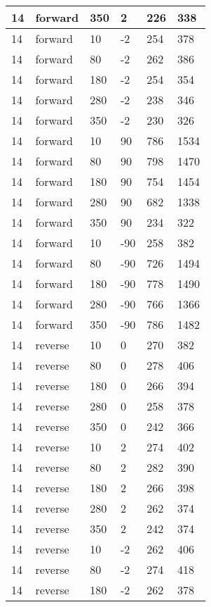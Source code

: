 \begin{longtable}{|l|l|l|l|l|l|}
			\hline
			14 & forward & 350 & 2 & 226 & 338 \\
			\hline
			14 & forward & 10 & -2 & 254 & 378 \\
			\hline
			14 & forward & 80 & -2 & 262 & 386 \\
			\hline
			14 & forward & 180 & -2 & 254 & 354 \\
			\hline
			14 & forward & 280 & -2 & 238 & 346 \\
			\hline
			14 & forward & 350 & -2 & 230 & 326 \\
			\hline
			14 & forward & 10 & 90 & 786 & 1534 \\
			\hline
			14 & forward & 80 & 90 & 798 & 1470 \\
			\hline
			14 & forward & 180 & 90 & 754 & 1454 \\
			\hline
			14 & forward & 280 & 90 & 682 & 1338 \\
			\hline
			14 & forward & 350 & 90 & 234 & 322 \\
			\hline
			14 & forward & 10 & -90 & 258 & 382 \\
			\hline
			14 & forward & 80 & -90 & 726 & 1494 \\
			\hline
			14 & forward & 180 & -90 & 778 & 1490 \\
			\hline
			14 & forward & 280 & -90 & 766 & 1366 \\
			\hline
			14 & forward & 350 & -90 & 786 & 1482 \\
			\hline
			14 & reverse & 10 & 0 & 270 & 382 \\
			\hline
			14 & reverse & 80 & 0 & 278 & 406 \\
			\hline
			14 & reverse & 180 & 0 & 266 & 394 \\
			\hline
			14 & reverse & 280 & 0 & 258 & 378 \\
			\hline
			14 & reverse & 350 & 0 & 242 & 366 \\
			\hline
			14 & reverse & 10 & 2 & 274 & 402 \\
			\hline
			14 & reverse & 80 & 2 & 282 & 390 \\
			\hline
			14 & reverse & 180 & 2 & 266 & 398 \\
			\hline
			14 & reverse & 280 & 2 & 262 & 374 \\
			\hline
			14 & reverse & 350 & 2 & 242 & 374 \\
			\hline
			14 & reverse & 10 & -2 & 262 & 406 \\
			\hline
			14 & reverse & 80 & -2 & 274 & 418 \\
			\hline
			14 & reverse & 180 & -2 & 262 & 378 \\

\end{longtable}

